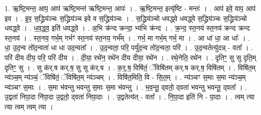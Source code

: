 \documentclass[17pt]{extarticle}
\begin{document}
1. ऋ॒ष्टि॒मन्त॒ आप॒ आप॑ ऋष्टि॒मन्त॑ ऋष्टि॒मन्त॒ आपः॑ । . ऋ॒ष्टि॒मन्त॒ इत्यृ॑ष्टि - मन्तः॑ । . आप॑ इवे॒ वाप॒ आप॑ इव । . इ॒व॒ स॒द्ध्रिय॑ञ्चः स॒द्ध्रिय॑ञ्च इवे व स॒द्ध्रिय॑ञ्चः । . स॒द्ध्रिय॑ञ्चो धवद्ध्वे धवद्ध्वे स॒द्ध्रिय॑ञ्चः स॒द्ध्रिय॑ञ्चो धवद्ध्वे । . ध॒व॒द्ध्व॒ इति॑ धवद्ध्वे । . अ॒भि क्र॑न्द क्रन्दा॒ भ्य॑भि क्र॑न्द । . क्र॒न्द॒ स्त॒नय॑ स्त॒नय॑ क्रन्द क्रन्द स्त॒नय॑ । . स्त॒नय॒ गर्भ॒म् गर्भꣳ॑ स्त॒नय॑ स्त॒नय॒ गर्भ᳚म् । . गर्भ॒ मा गर्भ॒म् गर्भ॒ मा । . आ धा॑ धा॒ आ धाः᳚ । . धा॒ उ॒द॒न्व तो॑द॒न्वता॑ धा धा उद॒न्वता᳚ । . उ॒द॒न्वता॒ परि॒ पर्यु॑द॒न्व तो॑द॒न्वता॒ परि॑ । . उ॒द॒न्वतेत्यु॑दन्न् - वता᳚ । . परि॑ दीय दीय॒ परि॒ परि॑ दीय । . दी॒या॒ रथे॑न॒ रथे॑न दीय दीया॒ रथे॑न । . रथे॒नेति॒ रथे॑न । . दृतिꣳ॒॒ सु सु दृति॒म् दृतिꣳ॒॒ सु । . सु क॑र्.ष कर्.ष॒ सु सु क॑र्.ष । . क॒र्॒.ष॒ विषि॑तं॒ ॅविषि॑तम् कर्.ष कर्.ष॒ विषि॑तम् । . विषि॑त॒म् न्य॑ञ्च॒म् न्य॑ञ्चं॒ ॅविषि॑तं॒ ॅविषि॑त॒म् न्य॑ञ्चम् । . विषि॑त॒मिति॒ वि - सि॒त॒म् । . न्य॑ञ्चꣳ स॒माः स॒मा न्य॑ञ्च॒म् न्य॑ञ्चꣳ स॒माः । . स॒मा भ॑वन्तु भवन्तु स॒माः स॒मा भ॑वन्तु । . भ॒व॒न्तू॒ द्‍वतो॒ द्‍वता॑ भवन्तु भवन्तू॒ द्‍वता᳚ । . उ॒द्वता॑ निपा॒दा नि॑पा॒दा उ॒द्वतो॒ द्‍वता॑ निपा॒दाः । . उ॒द्वतेत्य॑त् - वता᳚ । . नि॒पा॒दा इति॑ नि - पा॒दाः । . त्वम् त्या त्या त्वम् त्वम् त्या । \newline
\end{document}
